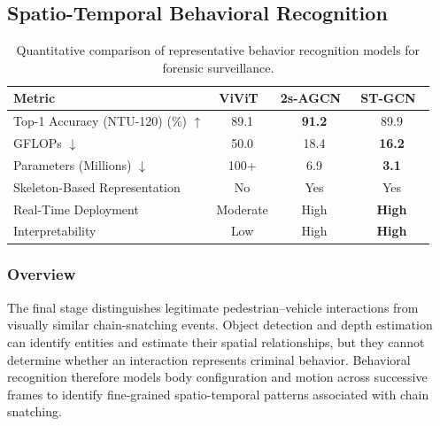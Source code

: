 \documentclass[runningheads]{llncs}
\begin{document}
\subsection{Spatio-Temporal Behavioral Recognition}

\begin{table}[!t]
\centering
\scriptsize
\renewcommand{\arraystretch}{1.2}
\caption{Quantitative comparison of representative behavior recognition models for forensic surveillance.}
\label{tab:behavior_quantitative}

\begin{tabular}{|l|c|c|c|}
\hline
\textbf{Metric} &
\textbf{ViViT~\cite{liu2022video}} &
\textbf{2s-AGCN~\cite{shi2019twostreamagcn}} &
\textbf{ST-GCN~\cite{yan2018stgcn}} \\ \hline

Top-1 Accuracy (NTU-120) (\%) $\uparrow$ &
89.1 &
\textbf{91.2} &
89.9 \\ \hline

GFLOPs $\downarrow$ &
50.0 &
18.4 &
\textbf{16.2} \\ \hline

Parameters (Millions) $\downarrow$ &
100+ &
6.9 &
\textbf{3.1} \\ \hline

Skeleton-Based Representation &
No &
Yes &
Yes \\ \hline

Real-Time Deployment &
Moderate &
High &
\textbf{High} \\ \hline

Interpretability &
Low &
High &
\textbf{High} \\ \hline

\end{tabular}
\end{table}

\subsubsection{Overview}

The final stage distinguishes legitimate pedestrian--vehicle interactions from visually similar chain-snatching events. Object detection and depth estimation can identify entities and estimate their spatial relationships, but they cannot determine whether an interaction represents criminal behavior. Behavioral recognition therefore models body configuration and motion across successive frames to identify fine-grained spatio-temporal patterns associated with chain snatching.
\end{document}

